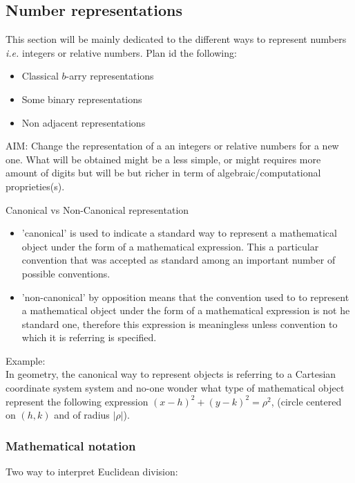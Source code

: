 \subsection{Number representations}
\label{RSA_representation}

This section will be mainly dedicated to the different ways to represent 
numbers \textit{i.e.} integers or relative numbers. Plan id the following:
\begin{itemize}
	\item  Classical $b$-arry representations
	\item  Some binary representations
	\item  Non adjacent representations
\end{itemize}
AIM: Change the representation of a an integers or relative numbers for a new one.
What will be obtained might be a less simple, or might requires  more amount of digits but will be but richer in term of algebraic/computational proprieties(s).\\

\noindent
	\begin{mydef}{Canonical vs Non-Canonical representation}
		\begin{itemize}
			\item 'canonical' is used to indicate a standard way to represent a 
			mathematical object under the form of a mathematical expression.
    		This a particular convention that was accepted as standard among 
    		an important number of possible conventions. 
			\item 'non-canonical' by opposition means that the convention used to 
			to represent a mathematical object under the form of a mathematical 
			expression is not he standard one, therefore this expression is 
			meaningless unless convention to which it is referring is specified.
		\end{itemize}
    \end{mydef}		

Example:\\
In geometry, the canonical way to represent objects is referring to a Cartesian 
coordinate system system and no-one wonder what type of mathematical object 
represent the following expression $(x-h)^2+(y-k)^2= \rho^2$, 
(circle centered on $(h,k)$ and of radius $|\rho|$).
\newpage
\subsubsection{Mathematical notation}
Two way to interpret Euclidean division: \\

